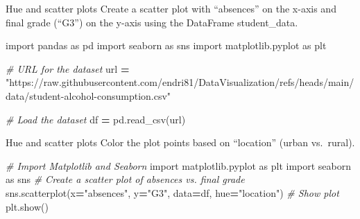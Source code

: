 \documentclass[
  ignorenonframetext,
]{beamer}
\newenvironment{Shaded}{\begin{snugshade}}{\end{snugshade}}
\newcommand{\CommentTok}[1]{\textcolor[rgb]{0.56,0.35,0.01}{\textit{#1}}}
\newcommand{\ImportTok}[1]{#1}
\newcommand{\NormalTok}[1]{#1}
\newcommand{\OperatorTok}[1]{\textcolor[rgb]{0.81,0.36,0.00}{\textbf{#1}}}
\newcommand{\StringTok}[1]{\textcolor[rgb]{0.31,0.60,0.02}{#1}}
\begin{document}
\begin{frame}[fragile]{Hue and scatter plots}
\label{hue-and-scatter-plots-2}
Create a scatter plot with ``absences'' on the x-axis and final grade
(``G3'') on the y-axis using the DataFrame student\_data.


\begin{Shaded}
\begin{Highlighting}[]
\ImportTok{import}\NormalTok{ pandas }\ImportTok{as}\NormalTok{ pd}
\ImportTok{import}\NormalTok{ seaborn }\ImportTok{as}\NormalTok{ sns}
\ImportTok{import}\NormalTok{ matplotlib.pyplot }\ImportTok{as}\NormalTok{ plt}

\CommentTok{\# URL for the dataset}
\NormalTok{url }\OperatorTok{=} \StringTok{"https://raw.githubusercontent.com/endri81/DataVisualization/refs/heads/main/data/student{-}alcohol{-}consumption.csv"}

\CommentTok{\# Load the dataset}
\NormalTok{df }\OperatorTok{=}\NormalTok{ pd.read\_csv(url)}
\end{Highlighting}
\end{Shaded}
\end{frame}

\begin{frame}[fragile]{Hue and scatter plots}
\label{hue-and-scatter-plots-3}
Color the plot points based on ``location'' (urban vs.~rural).


\begin{Shaded}
\begin{Highlighting}[]
\CommentTok{\# Import Matplotlib and Seaborn}
\ImportTok{import}\NormalTok{ matplotlib.pyplot }\ImportTok{as}\NormalTok{ plt}
\ImportTok{import}\NormalTok{ seaborn }\ImportTok{as}\NormalTok{ sns}
\CommentTok{\# Create a scatter plot of absences vs. final grade}
\NormalTok{sns.scatterplot(x}\OperatorTok{=}\StringTok{"absences"}\NormalTok{, y}\OperatorTok{=}\StringTok{"G3"}\NormalTok{, }
\NormalTok{                data}\OperatorTok{=}\NormalTok{df, }
\NormalTok{                hue}\OperatorTok{=}\StringTok{"location"}\NormalTok{)}
\CommentTok{\# Show plot}
\NormalTok{plt.show()}
\end{Highlighting}
\end{Shaded}
\end{frame}
\end{document}
